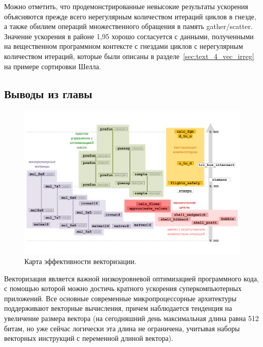 Можно отметить, что продемонстрированные невысокие результаты ускорения объясняются прежде всего нерегулярным количеством итераций циклов в гнезде, а также обилием операций множественного обращения в память gather/scatter.
Значение ускорения в районе 1,95 хорошо согласуется с данными, полученными на вещественном программном контексте с гнездами циклов с нерегулярным количеством итераций, которые были описаны в разделе~\ref{sec:text_4_vec_irreg} на примере сортировки Шелла\label{term:shell_sort2}.


\subsection{Выводы из главы}

\begin{figure}[ht]
\centering
\includegraphics[width=1.0\textwidth]{./pics/text_4_fin/map_cut.pdf}
\singlespacing
{}\caption{Карта эффективности векторизации.}
\label{fig:text_4_fin_map}
\end{figure}

Векторизация\label{term:vectorization7} является важной низкоуровневой оптимизацией программного кода, с помощью которой можно достичь кратного ускорения суперкомпьютерных приложений.
Все основные современные микропроцессорные архитектуры поддерживают векторные вычисления, причем наблюдается тенденция на увеличение размера вектора (на сегодняшний день максимальная длина равна 512 битам, но уже сейчас логически эта длина не ограничена, учитывая наборы векторных инструкций с переменной длиной вектора).

